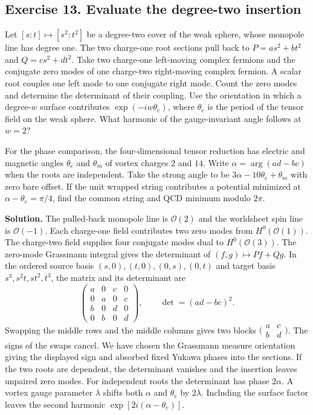 \documentclass[10pt]{article}
\begin{document}
\subsection{Exercise 13. Evaluate the degree-two insertion}
Let $[s:t]\mapsto[s^2:t^2]$ be a degree-two cover of the weak sphere, whose monopole line has degree one. The two charge-one root sections pull back to $P=a s^2+b t^2$ and $Q=c s^2+d t^2$. Take two charge-one left-moving complex fermions and the conjugate zero modes of one charge-two right-moving complex fermion. A scalar root couples one left mode to one conjugate right mode. Count the zero modes and determine the determinant of their coupling. Use the orientation in which a degree-$w$ surface contributes $\exp(-iw\theta_e)$, where $\theta_e$ is the period of the tensor field on the weak sphere. What harmonic of the gauge-invariant angle follows at $w=2$?

For the phase comparison, the four-dimensional tensor reduction has electric and magnetic angles $\theta_e$ and $\theta_m$ of vortex charges $2$ and $14$. Write $\alpha=\arg(ad-bc)$ when the roots are independent. Take the strong angle to be $3\alpha-10\theta_e+\theta_m$ with zero bare offset. If the unit wrapped string contributes a potential minimized at $\alpha-\theta_e=\pi/4$, find the common string and QCD minimum modulo $2\pi$.

\noindent\textbf{Solution.}
The pulled-back monopole line is $\mathcal O(2)$ and the worldsheet spin line is $\mathcal O(-1)$. Each charge-one field contributes two zero modes from $H^0(\mathcal O(1))$. The charge-two field supplies four conjugate modes dual to $H^0(\mathcal O(3))$. The zero-mode Grassmann integral gives the determinant of $(f,g)\mapsto Pf+Qg$. In the ordered source basis $(s,0),(t,0),(0,s),(0,t)$ and target basis $s^3,s^2t,st^2,t^3$, the matrix and its determinant are
\begin{equation}
 \begin{pmatrix}
 a&0&c&0\\
 0&a&0&c\\
 b&0&d&0\\
 0&b&0&d
 \end{pmatrix},
 \qquad \det=(ad-bc)^2 .
\end{equation}
Swapping the middle rows and the middle columns gives two blocks $\bigl(\begin{smallmatrix}a&c\\ b&d\end{smallmatrix}\bigr)$. The signs of the swaps cancel. We have chosen the Grassmann measure orientation giving the displayed sign and absorbed fixed Yukawa phases into the sections. If the two roots are dependent, the determinant vanishes and the insertion leaves unpaired zero modes. For independent roots the determinant has phase $2\alpha$. A vortex gauge parameter $\lambda$ shifts both $\alpha$ and $\theta_e$ by $2\lambda$. Including the surface factor leaves the second harmonic $\exp[2i(\alpha-\theta_e)]$.
\end{document}
